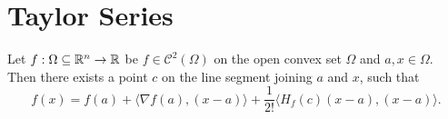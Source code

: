 
\section{Taylor Series} %
\label{sec:taylorseries}

\begin{thm}
	Let $f: \Omega \subseteq \mathbb{R}^n \to \mathbb{R}$ be
	$f \in \mathcal{C}^2(\Omega)$ on the open convex set
	$\Omega$ and $a,x \in \Omega$. Then there exists a point
	$c$ on the line segment joining $a$ and $x$, such that
	\[
		f(x) = f(a) + \langle \nabla f(a), (x - a) \rangle
		+ \frac{1}{2!} \langle H_{f}(c)(x - a), (x - a) \rangle .
	\]
\end{thm}
